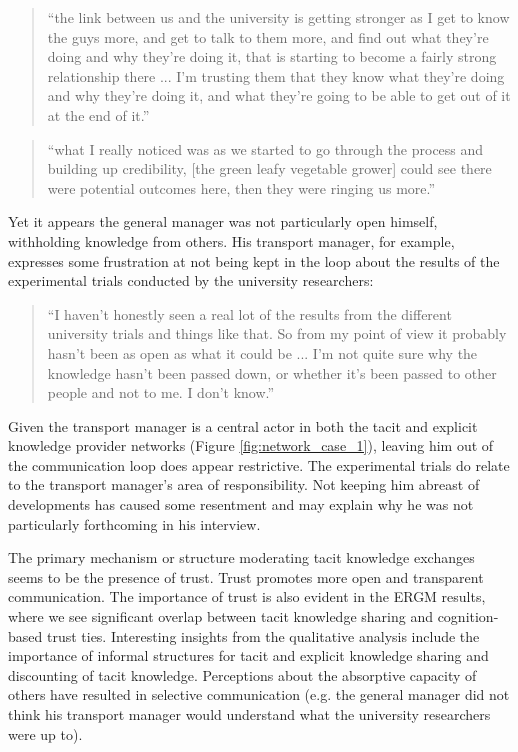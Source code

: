\begin{quote}
\small
\enquote{the link between us and the university is getting stronger as I get to know the guys more, and get to talk to them more, and find out what they're doing and why they're doing it, that is starting to become a fairly strong relationship there ... I'm trusting them that they know what they’re doing and why they’re doing it, and what they're going to be able to get out of it at the end of it.} \\
\end{quote}

\begin{quote}
\small
\enquote{what I really noticed was as we started to go through the process and building up credibility, [the green leafy vegetable grower] could see there were potential outcomes here, then they were ringing us more.} \\
\end{quote}

Yet it appears the general manager was not particularly open himself, withholding knowledge from others. His transport manager, for example, expresses some frustration at not being kept in the loop about the results of the experimental trials conducted by the university researchers:

\begin{quote}
\small
\enquote{I haven't honestly seen a real lot of the results from the different university trials and things like that. So from my point of view it probably hasn't been as open as what it could be ... I'm not quite sure why the knowledge hasn't been passed down, or whether it's been passed to other people and not to me. I don't know.} \\
\end{quote}

Given the transport manager is a central actor in both the tacit and explicit knowledge provider networks (Figure \ref{fig:network_case_1}), leaving him out of the communication loop does appear restrictive. The experimental trials do relate to the transport manager's area of responsibility. Not keeping him abreast of developments has caused some resentment and may explain why he was not particularly forthcoming in his interview. \medskip

The primary mechanism or structure moderating tacit knowledge exchanges seems to be the presence of trust. Trust promotes more open and transparent communication. The importance of trust is also evident in the ERGM results, where we see significant overlap between tacit knowledge sharing and cognition-based trust ties. Interesting insights from the qualitative analysis include the importance of informal structures for tacit and explicit knowledge sharing and discounting of tacit knowledge. Perceptions about the absorptive capacity of others have resulted in selective communication (e.g. the general manager did not think his transport manager would understand what the university researchers were up to).

